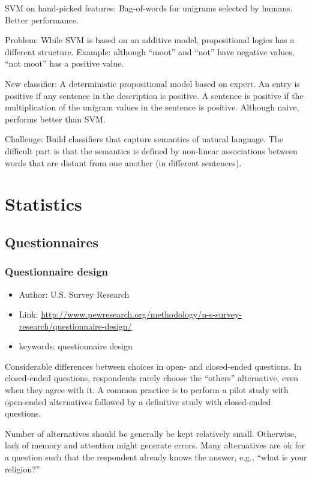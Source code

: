 \documentclass[]{report}
\providecommand{\tightlist}{%
  \setlength{\itemsep}{0pt}\setlength{\parskip}{0pt}}
\theoremstyle{definition}
\theoremstyle{definition}
\theoremstyle{definition}
\theoremstyle{remark}
\begin{document}
SVM on hand-picked features: Bag-of-words for unigrams selected by
humans. Better performance.

Problem: While SVM is based on an additive model, propositional logics
has a different structure. Example: although ``moot'' and ``not'' have
negative values, ``not moot'' has a positive value.

New classifier: A deterministic propositional model based on expert. An
entry is positive if any sentence in the description is positive. A
sentence is positive if the multiplication of the unigram values in the
sentence is positive. Although naive, performs better than SVM.

Challenge: Build classifiers that capture semantics of natural language.
The difficult part is that the semantics is defined by non-linear
associations between words that are distant from one another (in
different sentences).

\chapter{Statistics}\label{statistics}

\section{Questionnaires}\label{questionnaires}

\subsection{Questionnaire design}\label{questionnaire-design}

\begin{itemize}
\tightlist
\item
  Author: U.S. Survey Research
\item
  Link:
  \url{http://www.pewresearch.org/methodology/u-s-survey-research/questionnaire-design/}
\item
  keywords: questionnaire design
\end{itemize}

Considerable differences between choices in open- and closed-ended
questions. In closed-ended questions, respondents rarely choose the
``others'' alternative, even when they agree with it. A common practice
is to perform a pilot study with open-ended alternatives followed by a
definitive study with closed-ended questions.

Number of alternatives should be generally be kept relatively small.
Otherwise, lack of memory and attention might generate errors. Many
alternatives are ok for a question such that the respondent already
knows the answer, e.g., ``what is your religion?''
\end{document}
